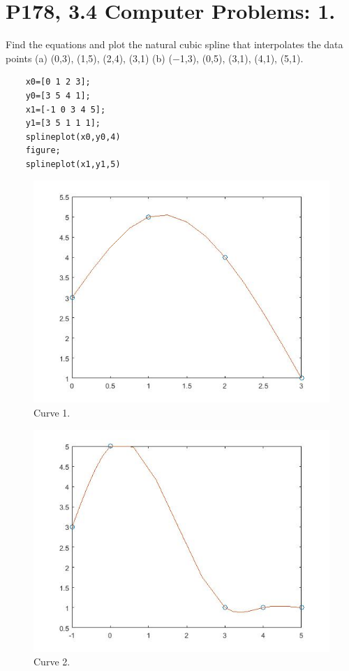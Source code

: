 \documentclass[UTF8]{ctexart}
\begin{document}
\section{P178, 3.4 Computer Problems: 1.}
Find the equations and plot the natural cubic spline that interpolates the data points (a) (0,3),
(1,5), (2,4), (3,1) (b) (−1,3), (0,5), (3,1), (4,1), (5,1).
\begin{centering}
	\begin{lstlisting}	
	x0=[0 1 2 3];
	y0=[3 5 4 1];
	x1=[-1 0 3 4 5];
	y1=[3 5 1 1 1];
	splineplot(x0,y0,4)
	figure;
	splineplot(x1,y1,5)
	\end{lstlisting}   
\end{centering}
\begin{figure}[htbp]
	\begin{center}
		\includegraphics[scale=0.7]{./curve.jpg}
		\caption{Curve 1.}
	\end{center}
\end{figure}
\begin{figure}[htbp]
\begin{center}
	\includegraphics[scale=0.7]{./curve2.jpg}
	\caption{Curve 2.}
\end{center}
\end{figure}
\end{document}
